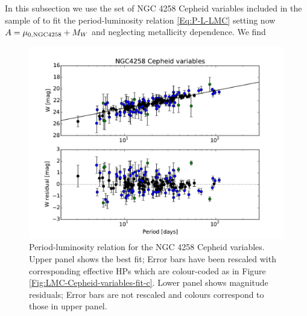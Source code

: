 In this subsection we use the set of NGC 4258 Cepheid variables included in the sample of \cite{Riess:2011yx} to fit the period-luminosity relation \eqref{Eq:P-L-LMC} setting now $A = \mu_{0,\rm NGC4258} + M_W$ and neglecting metallicity dependence. We find
\begin{figure}[tbp]
\centering %
\includegraphics[scale=0.75]{figures/chapter-h0/effective_HP_cepheids_NGC4258.pdf} 
\caption{Period-luminosity relation for the NGC 4258 Cepheid variables. Upper panel shows the best fit; Error bars have been rescaled with corresponding effective HPs which are colour-coded as in Figure \ref{Fig:LMC-Cepheid-variables-fit-c}. Lower panel shows magnitude residuals; Error bars are not rescaled and colours correspond to those in upper panel.}
\label{Fig:NGC4258-Cepheid-variables}
\end{figure}


